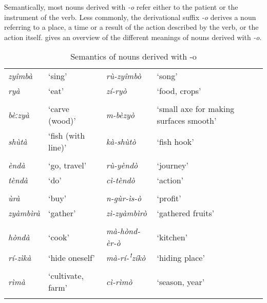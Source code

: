 Semantically, most nouns derived with \textit{-o} refer either to the patient or the instrument of the verb. Less commonly, the derivational suffix \textit{-o} derives a noun referring to a place, a time or a result of the action described by the verb, or the action itself.  gives an overview of the different meanings of nouns derived with \textit{-o}.

\begin{table}
\label{bkm:Ref490833448}\caption{\label{tab:4:13}Semantics of nouns derived with -o}

\begin{tabularx}{\textwidth}{lllQ}
\lsptoprule
{} \\
\midrule
\textit{zyîmbà}  & ‘sing’ & \textit{rù-zyîmbò} & ‘song’\\
\textit{ryà}  & ‘eat’ & \textit{zí-ryò} & ‘food, crops’\\
\tablevspace
{} \\
\midrule
\textit{bèːzyà} & ‘carve (wood)’ & \textit{m-bèzyò} & ‘small axe for making surfaces smooth’\\
\textit{shùtà}  & ‘fish (with line)’ & \textit{kà-shùtò} & ‘fish hook’\\
\tablevspace
{}\\
\midrule
\textit{èndà}  & ‘go, travel’ & \textit{rù-yèndò} & ‘journey’\\
\textit{tèndà}  & ‘do’ & \textit{cì-tèndò} & ‘action’\\
\tablevspace
{}\\
\midrule
\textit{ùrà}  & ‘buy’ & \textit{n-gùr-ìs-ò} & ‘profit’\\
\textit{zyàmbìrà}  & ‘gather’ & \textit{zì-zyàmbìrò} & ‘gathered fruits’\\
\tablevspace
{} \\
\midrule
\textit{hòndà}  & ‘cook’ & \textit{mà-hònd-èr-ò} & ‘kitchen’\\
\textit{rí-zìkà}  & ‘hide oneself’ & \textit{mà-rí-ꜝzíkò} & ‘hiding place’\\
\tablevspace
{}\\
\midrule
\textit{rìmà}  & ‘cultivate, farm’ & \textit{cì-rìmò} & ‘season, year’\\
\lspbottomrule
\end{tabularx}
\end{table}

